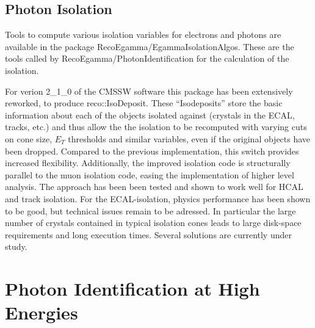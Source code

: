 \documentclass{cmspaper}
\begin{document}
\subsection{Photon Isolation}
Tools to compute various isolation variables for electrons and photons are available in the
package RecoEgamma/EgammaIsolationAlgos.  These are the tools called by RecoEgamma/PhotonIdentification 
for the calculation of the isolation.

For verion 2\_1\_0 of the CMSSW software this package has been extensively reworked, to produce 
reco::IsoDeposit. These ``Isodeposits'' store the basic information about each of the objects 
isolated against (crystals in the ECAL, tracks, etc.) and thus allow the the isolation to be 
recomputed with varying cuts on cone size, $E_T$ thresholds and similar variables, even if the 
original objects have been dropped.  Compared to the previous implementation, this switch 
provides increased flexibility. Additionally, the improved isolation code is structurally parallel 
to the muon isolation code, easing the implementation of higher level analysis.
The approach has been been tested and shown to work well for HCAL and track isolation.
For the ECAL-isolation, physics performance has been shown to be good, but technical issues 
remain to be adressed.  In particular the large number of crystals contained in typical isolation 
cones leads to large disk-space requirements and long execution times. Several solutions 
are currently under study.

\section{Photon Identification at High Energies}
\end{document}
